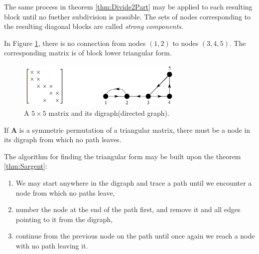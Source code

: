 \begin{defn}
The same process in theorem \ref{thm:Divide2Part} may be applied to
each resulting block until no fuether subdivision is possible. The
sets of nodes corresponding to the resulting diagonal blocks are
called \emph{strong components}.  
\end{defn}

\begin{exm}
  In Figure \ref{fig:SymPermToBTF}, there is no connection from nodes $(1,2)$ to nodes
  $(3,4,5)$. The corresponding matrix is of block lower triangular
  form.
  \begin{figure}[H]
    \centering
    \includegraphics[width=8cm]{png/SymPermToBTF.png}
    \caption{A $5\times 5$ matrix and its digraph(directed graph).}
    \label{fig:SymPermToBTF}
  \end{figure}
\end{exm}

\begin{thm} \label{thm:Sargent}
  If $\mathbf{A}$ is a symmetric permutation of a triangular matrix, there must
  be a node in its digraph from which no path leaves.
\end{thm}

\begin{alg}
  \label{algo:FindingTF}
  The algorithm for finding the triangular form may be built upon the
  theorem \ref{thm:Sargent}:
  \begin{enumerate}
  \item We may start anywhere in the digraph and trace a path until we
    encounter a node from which no paths leave,
  \item number the node at the end of the path first, and remove it
    and all edges pointing to it from the digraph,
  \item continue from the previous node on the path until once again
    we reach a node with no path leaving it.
  \end{enumerate}
\end{alg}

